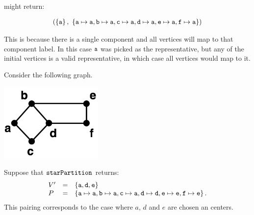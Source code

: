 \begin{flex}
\begin{example}
might return:

\begin{eqnarray*}
(\left\{ \texttt{a} \right\}, ~\left\{ \texttt{a} \mapsto \texttt{a}, 
                          \texttt{b} \mapsto \texttt{a}, 
                          \texttt{c} \mapsto \texttt{a}, 
                          \texttt{d} \mapsto \texttt{a}, 
                          \texttt{e} \mapsto \texttt{a}, 
                          \texttt{f} \mapsto \texttt{a} \right\})
\end{eqnarray*}

This is because there is a single component and all vertices will map
to that component label.  In this case $\texttt{a}$ was picked as the
representative, but any of the initial vertices is a valid
representative, in which case all vertices would map to it.
\end{example}

\begin{example}
\label{ex:graphcon::connect::nc::2}

Consider the following graph.

\begin{center}
\includegraphics[width=2.0in]{./graph-contraction/media-connectivity/contract-example1.jpg}
\end{center}

Suppose that $\texttt{starPartition}$ returns:
\[
\begin{array}{lcl}
V' & = & \left\{ \texttt{a},\texttt{d},\texttt{e} \right\}\\
P & = & 
 \left\{ \texttt{a} \mapsto \texttt{a}, \texttt{b} \mapsto \texttt{a}, 
       \texttt{c} \mapsto \texttt{a}, \texttt{d} \mapsto \texttt{d}, 
       \texttt{e} \mapsto \texttt{e}, \texttt{f} \mapsto \texttt{e} \right\}.
\end{array}
\]
%
This pairing corresponds to the case where $a$, $d$ and $e$ are chosen
an centers.
%


\end{example}
\end{flex}
